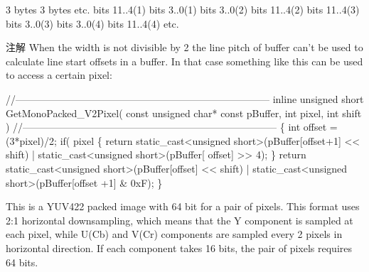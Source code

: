 \begin{Desc}
\begin{description}
\begin{DoxyCode}
3 bytes                                               3 bytes                                              
       etc.
bits 11..4(1) bits 3..0(1) bits 3..0(2) bits 11..4(2) bits 11..4(3) bits 3..0(3) bits 3..0(4) bits 11..4(4)
       etc.
\end{DoxyCode}


\begin{DoxyNote}{注解}
When the width is not divisible by 2 the line pitch of buffer can't be used to calculate line start offsets in a buffer. In that case something like this can be used to access a certain pixel\+:
\end{DoxyNote}

\begin{DoxyCode}
\textcolor{comment}{//-----------------------------------------------------------------------------}
\textcolor{keyword}{inline} \textcolor{keywordtype}{unsigned} \textcolor{keywordtype}{short} GetMonoPacked\_V2Pixel( \textcolor{keyword}{const} \textcolor{keywordtype}{unsigned} \textcolor{keywordtype}{char}* \textcolor{keyword}{const} pBuffer, \textcolor{keywordtype}{int} pixel, \textcolor{keywordtype}{int} shift )
\textcolor{comment}{//-----------------------------------------------------------------------------}
\{
  \textcolor{keywordtype}{int} offset = (3*pixel)/2;
  \textcolor{keywordflow}{if}( pixel %
  \{
    \textcolor{keywordflow}{return} \textcolor{keyword}{static\_cast<}\textcolor{keywordtype}{unsigned} \textcolor{keywordtype}{short}\textcolor{keyword}{>}(pBuffer[offset+1] << shift) | static\_cast<unsigned short>(pBuffer[
      offset] >> 4);
  \}
  \textcolor{keywordflow}{return} \textcolor{keyword}{static\_cast<}\textcolor{keywordtype}{unsigned} \textcolor{keywordtype}{short}\textcolor{keyword}{>}(pBuffer[offset] << shift) | static\_cast<unsigned short>(pBuffer[offset
      +1] & 0xF);
\}
\end{DoxyCode}
 \item[{\em 
\hypertarget{group___common_interface_gga02e0fc32ff10e0bc0f2e8b9c321d65c9ac7fbfb821c4a24fdbd2db2f7b8b47a0c}{idpf\+Y\+U\+V422\+\_\+10\+Packed}\label{group___common_interface_gga02e0fc32ff10e0bc0f2e8b9c321d65c9ac7fbfb821c4a24fdbd2db2f7b8b47a0c}
}]This is a Y\+U\+V422 packed image with 64 bit for a pair of pixels. This format uses 2\+:1 horizontal downsampling, which means that the Y component is sampled at each pixel, while U(\+Cb) and V(\+Cr) components are sampled every 2 pixels in horizontal direction. If each component takes 16 bits, the pair of pixels requires 64 bits.


\end{description}
\end{Desc}
